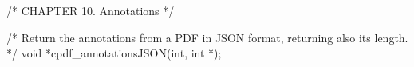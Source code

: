 /* CHAPTER 10. Annotations */

/* Return the annotations from a PDF in JSON format, returning also its length.
 */
void *cpdf_annotationsJSON(int, int *);

